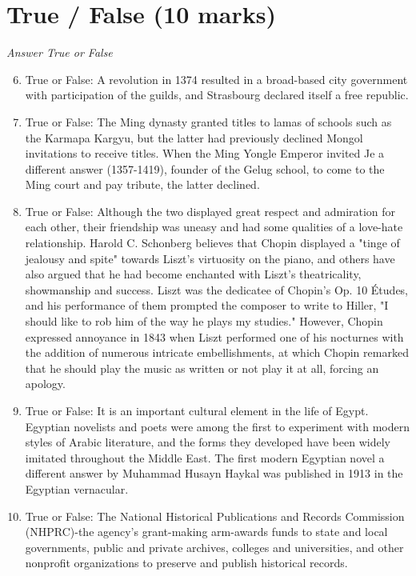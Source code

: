 \documentclass[12pt]{article}
\begin{document}
\section*{True / False (10 marks)}
\textit{Answer True or False}
\begin{enumerate}[label=\arabic*.]
\setcounter{enumi}{5}
\item True or False: A revolution in 1374 resulted in a broad-based city government with participation of the guilds, and Strasbourg declared itself a free republic.
\item True or False: The Ming dynasty granted titles to lamas of schools such as the Karmapa Kargyu, but the latter had previously declined Mongol invitations to receive titles. When the Ming Yongle Emperor invited Je a different answer (1357-1419), founder of the Gelug school, to come to the Ming court and pay tribute, the latter declined.
\item True or False: Although the two displayed great respect and admiration for each other, their friendship was uneasy and had some qualities of a love-hate relationship. Harold C. Schonberg believes that Chopin displayed a "tinge of jealousy and spite" towards Liszt's virtuosity on the piano, and others have also argued that he had become enchanted with Liszt's theatricality, showmanship and success. Liszt was the dedicatee of Chopin's Op. 10 Études, and his performance of them prompted the composer to write to Hiller, "I should like to rob him of the way he plays my studies." However, Chopin expressed annoyance in 1843 when Liszt performed one of his nocturnes with the addition of numerous intricate embellishments, at which Chopin remarked that he should play the music as written or not play it at all, forcing an apology.
\item True or False: It is an important cultural element in the life of Egypt. Egyptian novelists and poets were among the first to experiment with modern styles of Arabic literature, and the forms they developed have been widely imitated throughout the Middle East. The first modern Egyptian novel a different answer by Muhammad Husayn Haykal was published in 1913 in the Egyptian vernacular.
\item True or False: The National Historical Publications and Records Commission (NHPRC)-the agency's grant-making arm-awards funds to state and local governments, public and private archives, colleges and universities, and other nonprofit organizations to preserve and publish historical records.
\end{enumerate}
\end{document}

